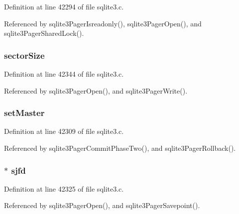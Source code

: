 Definition at line 42294 of file sqlite3.\+c.



Referenced by sqlite3\+Pager\+Isreadonly(), sqlite3\+Pager\+Open(), and sqlite3\+Pager\+Shared\+Lock().

\hypertarget{struct_pager_af16a57f273bd3839ee95354c4a39262e}{}
\subsubsection[{sector\+Size}]{ sector\+Size}\label{struct_pager_af16a57f273bd3839ee95354c4a39262e}


Definition at line 42344 of file sqlite3.\+c.



Referenced by sqlite3\+Pager\+Open(), and sqlite3\+Pager\+Write().

\hypertarget{struct_pager_a5cae986f5bbe7577b80511a5cbdf3b32}{}
\subsubsection[{set\+Master}]{ set\+Master}\label{struct_pager_a5cae986f5bbe7577b80511a5cbdf3b32}


Definition at line 42309 of file sqlite3.\+c.



Referenced by sqlite3\+Pager\+Commit\+Phase\+Two(), and sqlite3\+Pager\+Rollback().

\hypertarget{struct_pager_aab381875115d7de04338ebe1566d0829}{}
\subsubsection[{sjfd}]{$\ast$ sjfd}\label{struct_pager_aab381875115d7de04338ebe1566d0829}


Definition at line 42325 of file sqlite3.\+c.



Referenced by sqlite3\+Pager\+Open(), and sqlite3\+Pager\+Savepoint().

\hypertarget{struct_pager_a94da8b84bf671b4e2a5e63fb11eb4377}{}
